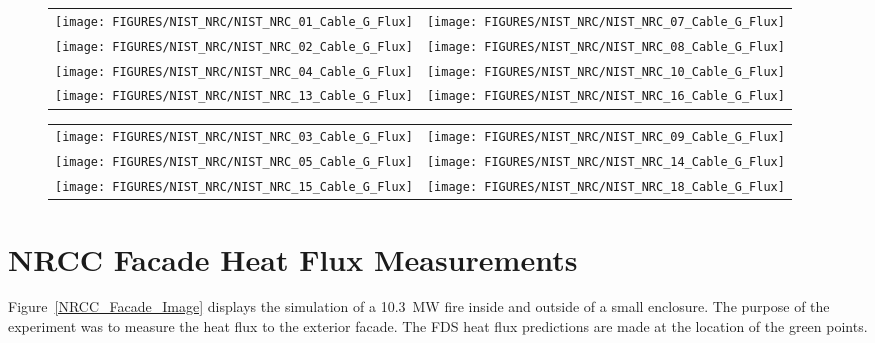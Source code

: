 \begin{figure}[p]
\begin{tabular*}{\textwidth}{l@{\extracolsep{\fill}}r}
\texttt{[image: FIGURES/NIST\_NRC/NIST\_NRC\_01\_Cable\_G\_Flux]} &
\texttt{[image: FIGURES/NIST\_NRC/NIST\_NRC\_07\_Cable\_G\_Flux]} \\
\texttt{[image: FIGURES/NIST\_NRC/NIST\_NRC\_02\_Cable\_G\_Flux]} &
\texttt{[image: FIGURES/NIST\_NRC/NIST\_NRC\_08\_Cable\_G\_Flux]} \\
\texttt{[image: FIGURES/NIST\_NRC/NIST\_NRC\_04\_Cable\_G\_Flux]} &
\texttt{[image: FIGURES/NIST\_NRC/NIST\_NRC\_10\_Cable\_G\_Flux]} \\
\texttt{[image: FIGURES/NIST\_NRC/NIST\_NRC\_13\_Cable\_G\_Flux]} &
\texttt{[image: FIGURES/NIST\_NRC/NIST\_NRC\_16\_Cable\_G\_Flux]}
\end{tabular*}
\label{NIST_NRC_Cable_G_Flux_Closed}
\end{figure}

\begin{figure}[p]
\begin{tabular*}{\textwidth}{l@{\extracolsep{\fill}}r}
\texttt{[image: FIGURES/NIST\_NRC/NIST\_NRC\_03\_Cable\_G\_Flux]} &
\texttt{[image: FIGURES/NIST\_NRC/NIST\_NRC\_09\_Cable\_G\_Flux]} \\
\texttt{[image: FIGURES/NIST\_NRC/NIST\_NRC\_05\_Cable\_G\_Flux]} &
\texttt{[image: FIGURES/NIST\_NRC/NIST\_NRC\_14\_Cable\_G\_Flux]} \\
\texttt{[image: FIGURES/NIST\_NRC/NIST\_NRC\_15\_Cable\_G\_Flux]} &
\texttt{[image: FIGURES/NIST\_NRC/NIST\_NRC\_18\_Cable\_G\_Flux]}
\end{tabular*}
\label{NIST_NRC_Cable_G_Flux_Open}
\end{figure}

\clearpage


\section{NRCC Facade Heat Flux Measurements}

Figure~\ref{NRCC_Facade_Image} displays the simulation of a 10.3~MW fire inside and outside of a small
enclosure. The purpose of the experiment was to measure the heat flux to the exterior facade. The
FDS heat flux predictions are made at the location of the green points.

